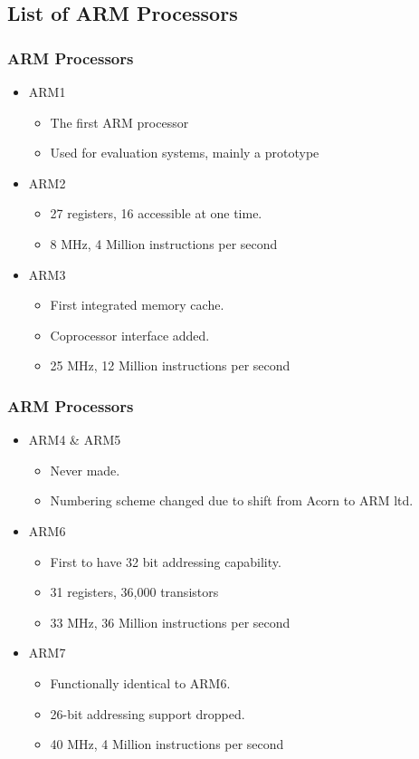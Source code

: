 \documentclass{beamer}
\begin{document}
\subsection{List of ARM Processors}
\begin{frame}
\frametitle{ARM Processors}

\begin{itemize}
\item ARM1
\begin{itemize}
\item The first ARM processor
\item Used for evaluation systems, mainly a prototype
\end{itemize}
\item ARM2
\begin{itemize}
\item 27 registers, 16 accessible at one time.
\item 8 MHz, 4 Million instructions per second
\end{itemize}

\item ARM3
\begin{itemize}
\item First integrated memory cache.
\item Coprocessor interface added.
\item 25 MHz, 12 Million instructions per second
\end{itemize}

\end{itemize}
\end{frame}

\begin{frame}
\frametitle{ARM Processors}

\begin{itemize}

\item ARM4 \& ARM5
\begin{itemize}
\item Never made.
\item Numbering scheme changed due to shift from Acorn to ARM ltd.
\end{itemize}

\item ARM6
\begin{itemize}
\item First to have 32 bit addressing capability.
\item 31 registers, 36,000 transistors
\item 33 MHz, 36 Million instructions per second
\end{itemize}


\item ARM7
\begin{itemize}
\item Functionally identical to ARM6.
\item 26-bit addressing support dropped.
\item 40 MHz, 4 Million instructions per second
\end{itemize}

\end{itemize}
\end{frame}
\end{document}
